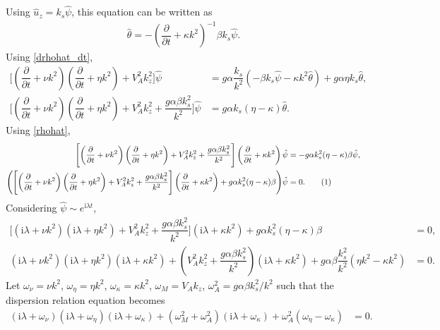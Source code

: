 \documentclass[12pt,psfig]{article}
\newcommand\numberthis{\addtocounter{equation}{1}\tag{\theequation}}
\begin{document}
Using $\hat{u}_z=k_s\hat{\psi}$, this equation can be written as
\begin{align}
\hat{\theta}=-\left(\dfrac{\partial}{\partial t}+\kappa k^2\right)^{-1}\beta k_s \hat{\psi}. \label{rhohat}
\end{align}
Using \eqref{drhohat_dt},
\begin{align*}
\Biggl[\left(\dfrac{\partial }{\partial t}+\nu k^2\right)\left(\dfrac{\partial }{\partial t}+\eta k^2\right)+V_A^2k_z^2\Biggr]\hat{\psi}&=g\alpha\dfrac{ k_s}{k^2}\left(-\beta k_s\hat{\psi}-\kappa k^2\hat{\theta}\right)+g\alpha\eta k_s\hat{\theta},\\
\Biggl[\left(\dfrac{\partial }{\partial t}+\nu k^2\right)\left(\dfrac{\partial }{\partial t}+\eta k^2\right)+V_A^2k_z^2+\dfrac{g \alpha \beta k_s^2}{k^2} \Biggr]\hat{\psi}&=g \alpha  k_s(\eta-\kappa) \hat{\theta}.
\end{align*}
Using \eqref{rhohat},
\begin{align*}
\Biggl[\left(\dfrac{\partial }{\partial t}+\nu k^2\right)\left(\dfrac{\partial }{\partial t}+\eta k^2\right)+V_A^2k_z^2+\dfrac{g \alpha \beta k_s^2}{k^2} \Biggr]\left(\dfrac{\partial}{\partial t}+\kappa k^2\right)\hat{\psi}&=-g \alpha  k_s^2(\eta-\kappa) \beta  \hat{\psi},\\
\Biggl(\Biggl[\left(\dfrac{\partial }{\partial t}+\nu k^2\right)\left(\dfrac{\partial }{\partial t}+\eta k^2\right)+V_A^2k_z^2+\dfrac{g \alpha \beta k_s^2}{k^2} \Biggr]\left(\dfrac{\partial}{\partial t}+\kappa k^2\right)+g \alpha  k_s^2(\eta-\kappa) \beta \Biggr) \hat{\psi}&=0.\numberthis \label{psihat}
\end{align*}
Considering $\hat{\psi}\sim e^{\mathrm{i}\lambda t}$,
\begin{align*}
\Biggl[\left(\mathrm{i}\lambda+\nu k^2\right)\left(\mathrm{i}\lambda+\eta k^2\right)+V_A^2k_z^2+\dfrac{g \alpha \beta k_s^2}{k^2} \Biggr]\left(\mathrm{i}\lambda+\kappa k^2\right)+g \alpha  k_s^2(\eta-\kappa) \beta  &=0,\\
\left(\mathrm{i}\lambda+\nu k^2\right)\left(\mathrm{i}\lambda+\eta k^2\right)\left(\mathrm{i}\lambda+\kappa k^2\right)+\left(V_A^2k_z^2+\dfrac{g \alpha \beta k_s^2}{k^2} \right)\left(\mathrm{i}\lambda+\kappa k^2\right)+g \alpha \beta \dfrac{k_s^2}{k^2}(\eta k^2-\kappa k^2)  &=0.
\end{align*}
Let $\omega_\nu=\nu k^2$, $\omega_\eta=\eta k^2$, $\omega_\kappa=\kappa k^2$, $\omega_M=V_A k_z$, $\omega_A^2=g\alpha \beta k_s^2/ k^2$ such that the dispersion relation equation becomes
\begin{align*}
\left(\mathrm{i}\lambda+\omega_\nu\right)\left(\mathrm{i}\lambda+\omega_\eta\right)\left(\mathrm{i}\lambda+\omega_\kappa\right)+\left(\omega_M^2+\omega_A^2 \right)\left(\mathrm{i}\lambda+\omega_\kappa\right)+\omega_A^2(\omega_\eta-\omega_\kappa) &=0.
\end{align*}
\end{document}
